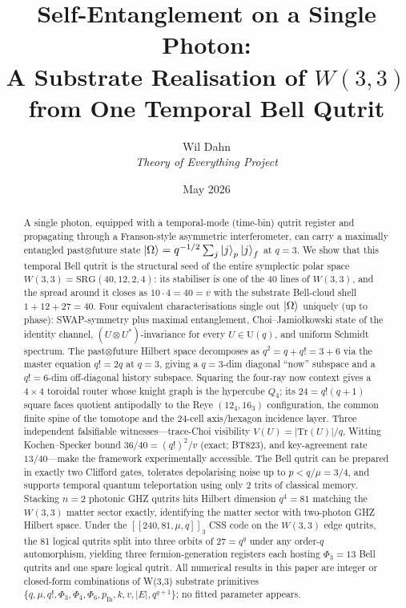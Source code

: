 \documentclass[11pt]{article}
\title{\textbf{Self-Entanglement on a Single Photon:\\
A Substrate Realisation of $W(3,3)$ from One Temporal Bell Qutrit}}
\author{Wil Dahn \\
\normalsize\textit{Theory of Everything Project}}
\date{May 2026}
\newcommand{\SRG}[4]{\mathrm{SRG}(#1,#2,#3,#4)}
\newcommand{\W}{W(3,3)}
\begin{document}
\maketitle

\begin{abstract}
A single photon, equipped with a temporal-mode (time-bin) qutrit register
and propagating through a Franson-style asymmetric interferometer, can
carry a maximally entangled past$\otimes$future state $\ket{\Omega} =
q^{-1/2}\sum_j\ket{j}_p\ket{j}_f$ at $q=3$.  We show that this temporal
Bell qutrit is the structural seed of the entire symplectic polar space
$\W = \SRG{40}{12}{2}{4}$: its stabiliser is one of the 40 lines of
$\W$, and the spread around it closes as $10 \cdot 4 = 40 = v$ with the
substrate Bell-cloud shell $1 + 12 + 27 = 40$.  Four equivalent
characterisations single out $\ket{\Omega}$ uniquely (up to phase):
SWAP-symmetry plus maximal entanglement, Choi--Jamio\l kowski state of
the identity channel, $(U\otimes U^*)$-invariance for every
$U\in\mathrm{U}(q)$, and uniform Schmidt spectrum.  The past$\otimes$future
Hilbert space decomposes as $q^2 = q + q! = 3 + 6$ via the master equation
$q!=2q$ at $q=3$, giving a $q=3$-dim diagonal ``now'' subspace and a
$q!=6$-dim off-diagonal history subspace.  Squaring the four-ray now
context gives a $4\times4$ toroidal router whose knight graph is the
hypercube $Q_4$; its $24=q!(q+1)$ square faces quotient antipodally to
the Reye $(12_4,16_3)$ configuration, the common finite spine of the
tomotope and the $24$-cell axis/hexagon incidence layer.  Three independent falsifiable
witnesses---trace-Choi visibility $V(U) = |\mathrm{Tr}(U)|/q$, Witting
Kochen--Specker bound $36/40 = (q!)^2/v$ (exact; BT823), and key-agreement rate $13/40$---make the
framework experimentally accessible.  The Bell qutrit can be prepared in
exactly two Clifford gates, tolerates depolarising noise up to $p<q/\mu=3/4$,
and supports temporal quantum teleportation using only $2$ trits of
classical memory.  Stacking $n=2$ photonic GHZ qutrits hits Hilbert
dimension $q^4 = 81$ matching the $\W$ matter sector exactly, identifying
the matter sector with two-photon GHZ Hilbert space.  Under the
$[[240, 81, \mu, q]]_3$ CSS code on the $\W$ edge qutrits, the 81 logical
qutrits split into three orbits of $27 = q^q$ under any order-$q$
automorphism, yielding three fermion-generation registers each hosting
$\Phi_3 = 13$ Bell qutrits and one spare logical qutrit.  All numerical
results in this paper are integer or closed-form combinations of W(3,3)
substrate primitives $\{q, \mu, q!, \Phi_3, \Phi_4, \Phi_6, p_{\mathrm{Ih}},
k, v, |E|, q^{q+1}\}$; no fitted parameter appears.
\end{abstract}
\end{document}
